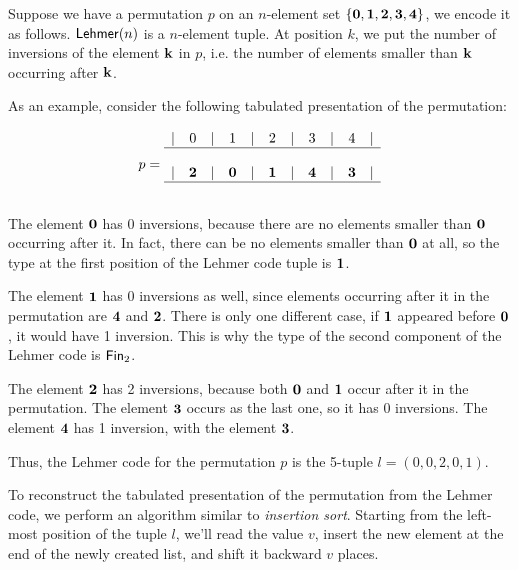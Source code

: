 
Suppose we have a permutation $p$ on an $n$-element set
$\{\mathbf{0}, \mathbf{1}, \mathbf{2}, \mathbf{3}, \mathbf{4}\}$, we encode it as follows.
$\Lehmer[n]$ is a $n$-element tuple. At position $k$, we put the number of
inversions of the element $\mathbf{k}$ in $p$, i.e. the number of elements smaller
than $\mathbf{k}$ occurring after $\mathbf{k}$.

As an example, consider the following tabulated presentation of the permutation:


\[
  p =
  \begin{array}{ccccccccccccccc}
    | & 0      & | & 1      & | & 2      & | & 3      & | & 4      & | \\
    \hline                                                             \\
    | & \mathbf{2} & | & \mathbf{0} & | & \mathbf{1} & | & \mathbf{4} & | & \mathbf{3} & | \\
    \hline                                                             \\
  \end{array}
\]


The element $\mathbf{0}$ has 0 inversions, because there are no elements smaller
than $\mathbf{0}$ occurring after it. In fact, there can be no elements smaller than
$\mathbf{0}$ at all, so the type at the first position of the Lehmer code tuple is
${\mathbf{1}}$.

The element $\mathbf{1}$ has 0 inversions as well, since elements occurring after it
in the permutation are $\mathbf{4}$ and $\mathbf{2}$. There is only one different case,
if $\mathbf{1}$ appeared before $\mathbf{0}$, it would have 1 inversion. This is why the
type of the second component of the Lehmer code is $\Fin[2]$.

The element $\mathbf{2}$ has 2 inversions, because both $\mathbf{0}$ and $\mathbf{1}$ occur
after it in the permutation. The element $\mathbf{3}$ occurs as the last one, so it
has 0 inversions. The element $\mathbf{4}$ has 1 inversion, with the element
$\mathbf{3}$.

Thus, the Lehmer code for the permutation $p$ is the 5-tuple
$l = (0, 0, 2, 0, 1)$.

To reconstruct the tabulated presentation of the permutation from the Lehmer
code, we perform an algorithm similar to \emph{insertion sort}. Starting from
the left-most position of the tuple $l$, we'll read the value $v$, insert the
new element at the end of the newly created list, and shift it backward $v$
places.

